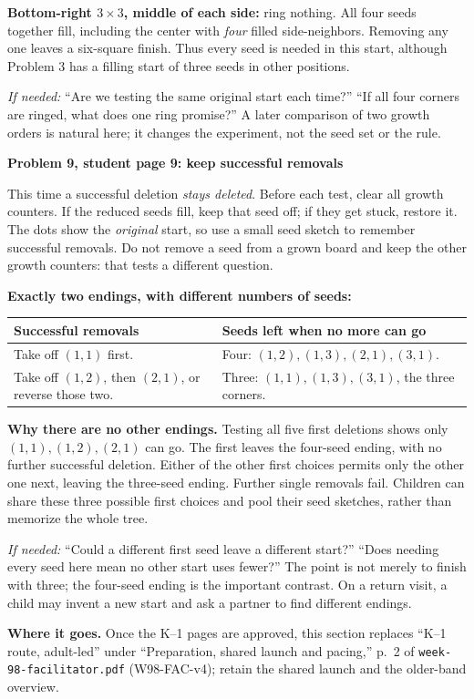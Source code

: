 \documentclass[11pt]{article}
\newcommand{\sub}[1]{\par\textbf{#1}\par}
\newcommand{\hint}[1]{\textit{If needed:} #1}
\begin{document}
\textbf{Bottom-right $3\times3$, middle of each side:} ring nothing. All four seeds together fill, including the center with \emph{four} filled side-neighbors. Removing any one leaves a six-square finish. Thus every seed is needed in this start, although Problem 3 has a filling start of three seeds in other positions.

\hint{``Are we testing the same original start each time?'' ``If all four corners are ringed, what does one ring promise?''} A later comparison of two growth orders is natural here; it changes the experiment, not the seed set or the rule.

\sub{Problem 9, student page 9: keep successful removals}
This time a successful deletion \emph{stays deleted}. Before each test, clear all growth counters. If the reduced seeds fill, keep that seed off; if they get stuck, restore it. The dots show the \emph{original} start, so use a small seed sketch to remember successful removals. Do not remove a seed from a grown board and keep the other growth counters: that tests a different question.

\textbf{Exactly two endings, with different numbers of seeds:}
\begin{center}\renewcommand{\arraystretch}{1.2}
\begin{tabular}{p{.39\linewidth} p{.52\linewidth}}
Successful removals & Seeds left when no more can go\\\midrule
Take off $(1,1)$ first. & Four: $(1,2),(1,3),(2,1),(3,1)$.\\
Take off $(1,2)$, then $(2,1)$, or reverse those two. & Three: $(1,1),(1,3),(3,1)$, the three corners.
\end{tabular}\end{center}
\textbf{Why there are no other endings.} Testing all five first deletions shows only $(1,1),(1,2),(2,1)$ can go. The first leaves the four-seed ending, with no further successful deletion. Either of the other first choices permits only the other one next, leaving the three-seed ending. Further single removals fail. Children can share these three possible first choices and pool their seed sketches, rather than memorize the whole tree.

\hint{``Could a different first seed leave a different start?'' ``Does needing every seed here mean no other start uses fewer?''} The point is not merely to finish with three; the four-seed ending is the important contrast. On a return visit, a child may invent a new start and ask a partner to find different endings.

\textbf{Where it goes.} Once the K--1 pages are approved, this section replaces ``K--1 route, adult-led'' under ``Preparation, shared launch and pacing,'' p.\ 2 of \texttt{week-98-facilitator.pdf} (W98-FAC-v4); retain the shared launch and the older-band overview.
\end{document}
